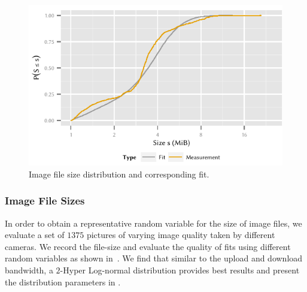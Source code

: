 \begin{figure}
  \includegraphics{application/cloud_file_synchronization/application_measurements/figures/image_size}
  \caption{Image file size distribution \imageFileSize and corresponding fit.}
  \label{fig:application:cloud_file_synchronisation:application_measurements:bandwidth_preparation_times:measurement_setup:image_size}
\end{figure}

\subsubsection*{Image File Sizes}\label{sec:application:cloud_file_synchronisation:application_measurements:image_file_sizes}
In order to obtain a representative random variable for the size of image files, we evaluate a set of \({1375}\) pictures of varying image quality taken by different cameras.
We record the file-size and evaluate the quality of fits using different random variables as shown in~.
We find that similar to the upload and download bandwidth, a \(2\)-Hyper Log-normal distribution provides best results and present the distribution parameters in .

